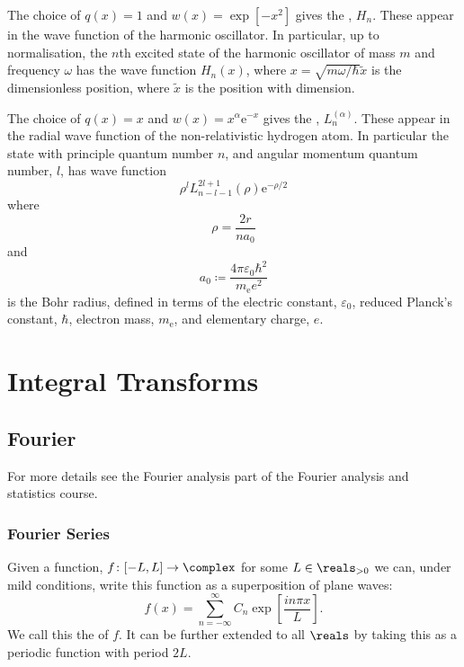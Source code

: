 \documentclass[fleqn]{NotesClass}
\newcommand*{\e}{\mathrm{e}}
\begin{document}
    The choice of \(q(x) = 1\) and \(w(x) = \exp[-x^2]\) gives the , \(H_n\).
    These appear in the wave function of the harmonic oscillator.
    In particular, up to normalisation, the \(n\)th excited state of the harmonic oscillator of mass \(m\) and frequency \(\omega\) has the wave function \(H_n(x)\), where \(x = \sqrt{m\omega/\hbar}\tilde{x}\) is the dimensionless position, where \(\tilde{x}\) is the position with dimension.
    
    The choice of \(q(x) = x\) and \(w(x) = x^\alpha\e^{-x}\) gives the , \(L_n^{(\alpha)}\). 
    These appear in the radial wave function of the non-relativistic hydrogen atom.
    In particular the state with principle quantum number \(n\), and angular momentum quantum number, \(l\), has wave function
    \begin{equation}
        \rho^lL_{n-l-1}^{2l+1}(\rho) \e^{-\rho/2}
    \end{equation}
    where
    \begin{equation}
        \rho = \frac{2r}{na_0}
    \end{equation}
    and
    \begin{equation}
        a_0 \coloneqq \frac{4\pi\varepsilon_{0}\hbar^2}{m_{\mathrm{e}}e^2}
    \end{equation}
    is the Bohr radius, defined in terms of the electric constant, \(\varepsilon_{0}\), reduced Planck's constant, \(\hbar\), electron mass, \(m_{\mathrm{e}}\), and elementary charge, \(e\).
    
    \part{Integral Transforms}
    \chapter{Fourier}
    \begin{rmk}
        For more details see the Fourier analysis part of the Fourier analysis and statistics course.
    \end{rmk}
    \section{Fourier Series}
    Given a function, \(f \colon [-L, L] \to \complex\) for some \(L \in \reals_{>0}\) we can, under mild conditions, write this function as a superposition of plane waves:
    \begin{equation}
        f(x) = \sum_{n=-\infty}^{\infty} C_n\exp\left[ \frac{in\pi x}{L} \right].
    \end{equation}
    We call this the  of \(f\).
    It can be further extended to all \(\reals\) by taking this as a periodic function with period \(2L\).
    
\end{document}
